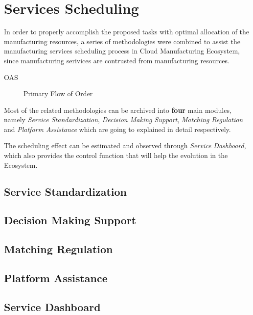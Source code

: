 \section{Services Scheduling} %
\label{sec:schedule}

In order to properly accomplish the proposed tasks with optimal allocation of the manufacturing resources, a series of methodologies were combined to assist the manufacturing services scheduling process in Cloud Manufacturing Ecosystem, since manufacturing serivices are contrusted from manufacturing resources. 

OAS  
\begin{figure}[!h]
\centering\small\resizebox{0.6\textwidth}{!}{}
\caption{Primary Flow of Order}
\label{fig:orderflow}
\end{figure}
Most of the related methodologies can be archived into \textbf{four} main modules, namely \textit{Service Standardization}, \textit{Decision Making Support}, \textit{Matching Regulation} and \textit{Platform Assistance} which are going to explained in detail respectively.

The scheduling effect can be estimated and observed through \textit{Service Dashboard}, which also provides the control function that will help the evolution in the Ecosystem.

\subsection{Service Standardization} %
\label{sub:service_standardization}


\subsection{Decision Making Support} %
\label{sub:decision_making_support}


\subsection{Matching Regulation} %
\label{sub:matching_regulation}


\subsection{Platform Assistance} %
\label{sub:platform_assistance}


\subsection{Service Dashboard} %
\label{sub:service_dashboard}

